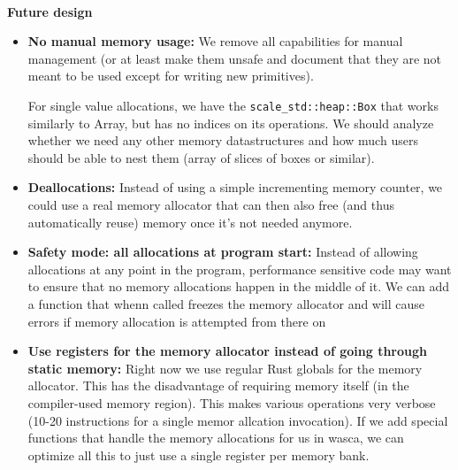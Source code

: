 ~ \\

\noindent
{\bf Future design}

\begin{itemize}
\item {\bf No manual memory usage:}
We remove all capabilities for manual management (or at least make them unsafe and document that they are not meant to be used except for writing new primitives).

For single value allocations, we have the \verb|scale_std::heap::Box| that works similarly to Array, but has no indices on its operations. We should analyze whether we need any other memory datastructures and how much users should be able to nest them (array of slices of boxes or similar).

\item {\bf Deallocations:}
Instead of using a simple incrementing memory counter, we could use a real memory allocator that can then also free (and thus automatically reuse) memory once it’s not needed anymore.

\item {\bf Safety mode: all allocations at program start:}
Instead of allowing allocations at any point in the program, performance sensitive code may want to ensure that no memory allocations happen in the middle of it. We can add a function that whenn called freezes the memory allocator and will cause errors if memory allocation is attempted from there on

\item {\bf Use registers for the memory allocator instead of going through static memory:}
Right now we use regular Rust globals for the memory allocator. This has the disadvantage of requiring memory itself (in the compiler-used memory region). This makes various operations very verbose (10-20 instructions for a single memor allcation invocation). If we add special functions that handle the memory allocations for us in wasca, we can optimize all this to just use a single register per memory bank.

\end{itemize}

